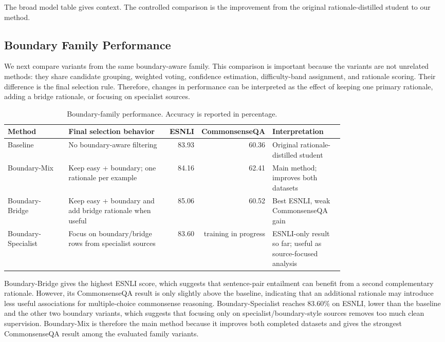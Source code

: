 The broad model table gives context. The controlled comparison is the improvement from the original rationale-distilled student to our method.

\subsection{Boundary Family Performance}
\label{sec:boundary-family-performance}

We next compare variants from the same boundary-aware family. This comparison is important because the variants are not unrelated methods: they share candidate grouping, weighted voting, confidence estimation, difficulty-band assignment, and rationale scoring. Their difference is the final selection rule. Therefore, changes in performance can be interpreted as the effect of keeping one primary rationale, adding a bridge rationale, or focusing on specialist sources.

\begin{table}[H]
\centering
\caption{Boundary-family performance. Accuracy is reported in percentage.}
\label{tab:boundary-family-performance}
\begin{tabular}{p{0.20\linewidth} p{0.34\linewidth} r r p{0.22\linewidth}}
\hline
Method & Final selection behavior & ESNLI & CommonsenseQA & Interpretation \\
\hline
Baseline & No boundary-aware filtering & 83.93 & 60.36 & Original rationale-distilled student \\
\hline
Boundary-Mix & Keep easy + boundary; one rationale per example & 84.16 & 62.41 & Main method; improves both datasets \\
\hline
Boundary-Bridge & Keep easy + boundary and add bridge rationale when useful & 85.06 & 60.52 & Best ESNLI, weak CommonsenseQA gain \\
\hline
Boundary-Specialist & Focus on boundary/bridge rows from specialist sources & 83.60 & training in progress & ESNLI-only result so far; useful as source-focused analysis \\
\hline
\end{tabular}
\end{table}

Boundary-Bridge gives the highest ESNLI score, which suggests that sentence-pair entailment can benefit from a second complementary rationale. However, its CommonsenseQA result is only slightly above the baseline, indicating that an additional rationale may introduce less useful associations for multiple-choice commonsense reasoning. Boundary-Specialist reaches 83.60\% on ESNLI, lower than the baseline and the other two boundary variants, which suggests that focusing only on specialist/boundary-style sources removes too much clean supervision. Boundary-Mix is therefore the main method because it improves both completed datasets and gives the strongest CommonsenseQA result among the evaluated family variants.

